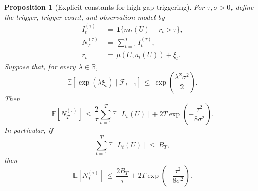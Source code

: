 \documentclass{article} %
\newtheorem{proposition}[theorem]{Proposition}
\begin{document}
\begin{proposition}[Explicit constants for high-gap triggering]
\label{prop:12}
For \(\tau,\sigma>0\), define the trigger, trigger count, and observation
model by
\begin{align}
\label{eq:app-fifth-trigger-def}
I_t^{(\tau)}
&\,=\,
\mathbf 1\{m_t(U)-r_t>\tau\},
\\
\label{eq:app-fifth-trigger-count}
N_T^{(\tau)}
&\,=\,
\sum_{t=1}^T I_t^{(\tau)},
\\
\label{eq:app-fifth-reward-noise}
r_t
&\,=\,
\mu(U,a_t(U))+\xi_t.
\end{align}
Suppose that, for every \(\lambda\in\mathbb R\),
\begin{equation}
\label{eq:app-fifth-subg}
\mathbb{E}\!\left[
\exp(\lambda \xi_t)\mid \mathcal{F}_{t-1}
\right]
\,\leq\,
\exp\!\left(\frac{\lambda^2\sigma^2}{2}\right).
\end{equation}
Then
\begin{equation}
\label{eq:app-fifth-trigger-bound}
\mathbb{E}\!\left[N_T^{(\tau)}\right]
\,\leq\,
\frac{2}{\tau}
\sum_{t=1}^{T}\mathbb{E}[L_t(U)]
+
2T\exp\!\left(-\frac{\tau^2}{8\sigma^2}\right).
\end{equation}
In particular, if
\begin{equation}
\label{eq:app-fifth-trigger-BT-assumption}
\sum_{t=1}^T\mathbb E[L_t(U)]\,\leq\, B_T,
\end{equation}
then
\begin{equation}
\label{eq:app-fifth-trigger-BT}
\mathbb{E}\!\left[N_T^{(\tau)}\right]
\,\leq\,
\frac{2B_T}{\tau}
+
2T\exp\!\left(-\frac{\tau^2}{8\sigma^2}\right).
\end{equation}
\end{proposition}
\end{document}
